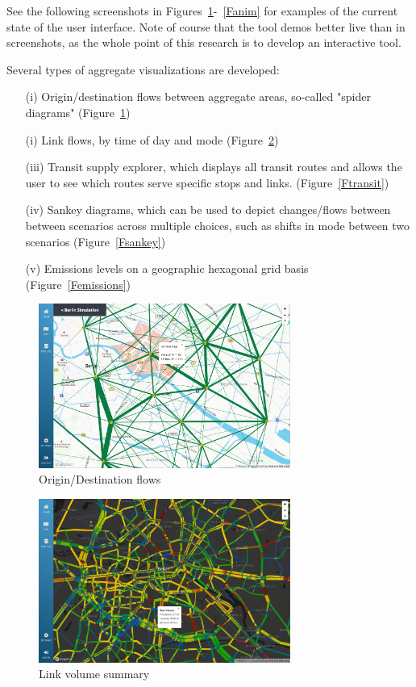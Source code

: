 \documentclass[Afour,sagev,times]{sagej}
\begin{document}
See the following screenshots in Figures~\ref{Fod}-~\ref{Fanim} for examples of the current state of the user interface. Note of course that the tool demos better live than in screenshots, as the whole point of this research is to develop an interactive tool.

Several types of aggregate visualizations are developed:

\begin{enumerate}

\item[(i)] Origin/destination flows between aggregate areas, so-called "spider diagrams" (Figure~\ref{Fod})
\item[(i)] Link flows, by time of day and mode (Figure~\ref{Flinkvols})
\item[(iii)] Transit supply explorer, which displays all transit routes and allows the user to see which routes serve specific stops and links. (Figure~\ref{Ftransit})
\item[(iv)] Sankey diagrams, which can be used to depict changes/flows between between scenarios across multiple choices, such as shifts in mode between two scenarios (Figure~\ref{Fsankey})
\item[(v)] Emissions levels on a geographic hexagonal grid basis (Figure~\ref{Femissions})

\end{enumerate}

\begin{figure}
\centering
\includegraphics[width=3.25in]{fig-2.png}
\caption{Origin/Destination flows}\label{Fod}
\end{figure}

\begin{figure}
\centering
\includegraphics[width=3.25in]{fig-3.png}
\caption{Link volume summary}\label{Flinkvols}
\end{figure}
\end{document}
